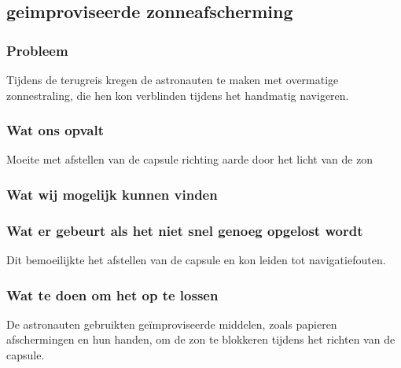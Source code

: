 \subsection{geimproviseerde zonneafscherming}

\subsubsection{Probleem}
Tijdens de terugreis kregen de astronauten te maken met overmatige zonnestraling, die hen kon verblinden tijdens het handmatig navigeren.

\subsubsection{Wat ons opvalt}
Moeite met afstellen van de capsule richting aarde door het licht van de zon

\subsubsection{Wat wij mogelijk kunnen vinden}

\subsubsection{Wat er gebeurt als het niet snel genoeg opgelost wordt}
Dit bemoeilijkte het afstellen van de capsule en kon leiden tot navigatiefouten.

\subsubsection{Wat te doen om het op te lossen}
De astronauten gebruikten geïmproviseerde middelen, zoals papieren afschermingen en hun handen, om de zon te blokkeren tijdens het richten van de capsule.